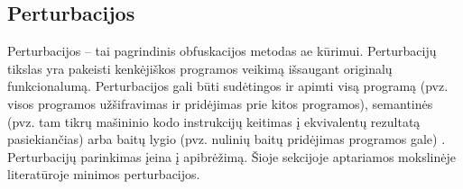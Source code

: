 \subsection{Perturbacijos}\label{sec:literature:perturbations}

Perturbacijos -- tai pagrindinis obfuskacijos metodas \ac{ae} kūrimui.
Perturbacijų tikslas yra pakeisti kenkėjiškos programos veikimą išsaugant
originalų funkcionalumą. Perturbacijos gali būti sudėtingos ir apimti visą
programą (pvz. visos programos užšifravimas ir pridėjimas prie kitos
programos), semantinės (pvz. tam tikrų mašininio kodo instrukcijų keitimas į
ekvivalentų rezultatą pasiekiančias) arba baitų lygio (pvz. nulinių baitų
pridėjimas programos gale) \citeplace. Perturbacijų parinkimas įeina į 
apibrėžimą. Šioje sekcijoje aptariamos mokslinėje literatūroje minimos
perturbacijos.
